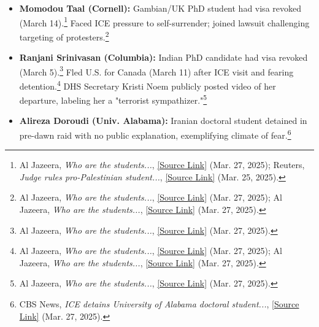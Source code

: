 \documentclass[11pt, letterpaper]{article}
\begin{document}
\begin{itemize}
        \item \textbf{Momodou Taal (Cornell):} Gambian/UK PhD student had visa revoked (March 14).\footnote{Al Jazeera, \emph{Who are the students...}, \href{https://www.aljazeera.com/news/2025/3/27/who-are-the-students-trump-wants-to-deport\#:~:text=Advertisement}{[Source Link]} (Mar. 27, 2025); Reuters, \emph{Judge rules pro-Palestinian student...}, \href{https://www.reuters.com/legal/judge-rules-pro-palestinian-student-permanent-us-resident-cannot-be-detained-2025-03-25/\#:~:text=Badar\%20Khan\%20Suri\%20\%2C\%20an,A\%20federal\%20judge\%20\%20102}{[Source Link]} (Mar. 25, 2025).} Faced ICE pressure to self-surrender; joined lawsuit challenging targeting of protesters.\footnote{Al Jazeera, \emph{Who are the students...}, \href{https://www.aljazeera.com/news/2025/3/27/who-are-the-students-trump-wants-to-deport\#:~:text=On\%20the\%20morning\%20of\%20March,his\%20residence\%2C\%20including\%20on\%20campus}{[Source Link]} (Mar. 27, 2025); Al Jazeera, \emph{Who are the students...}, \href{https://www.aljazeera.com/news/2025/3/27/who-are-the-students-trump-wants-to-deport\#:~:text=Taal\%20told\%20Al\%20Jazeera\%20that,one\%20focused\%20on\%20university\%20campuses}{[Source Link]} (Mar. 27, 2025).}
        \item \textbf{Ranjani Srinivasan (Columbia):} Indian PhD candidate had visa revoked (March 5).\footnote{Al Jazeera, \emph{Who are the students...}, \href{https://www.aljazeera.com/news/2025/3/27/who-are-the-students-trump-wants-to-deport\#:~:text=Ranjani\%20Srinivasan\%2C\%2037\%2C\%20had\%20her,a\%20valid\%20visa\%20until\%202029}{[Source Link]} (Mar. 27, 2025).} Fled U.S. for Canada (March 11) after ICE visit and fearing detention.\footnote{Al Jazeera, \emph{Who are the students...}, \href{https://www.aljazeera.com/news/2025/3/27/who-are-the-students-trump-wants-to-deport\#:~:text=On\%20March\%207\%2C\%20individuals\%20claiming,the\%20US\%2C\%20before\%20eventually\%20leaving}{[Source Link]} (Mar. 27, 2025); Al Jazeera, \emph{Who are the students...}, \href{https://www.aljazeera.com/news/2025/3/27/who-are-the-students-trump-wants-to-deport\#:~:text=After\%20this\%2C\%20Srinivasan\%20left\%20her,\%E2\%80\%9D}{[Source Link]} (Mar. 27, 2025).} DHS Secretary Kristi Noem publicly posted video of her departure, labeling her a "terrorist sympathizer."\footnote{Al Jazeera, \emph{Who are the students...}, \href{https://www.aljazeera.com/news/2025/3/27/who-are-the-students-trump-wants-to-deport\#:~:text=On\%20March\%2014\%2C\%20DHS\%20Secretary,sympathizers\%E2\%80\%9D\%20leaving\%20on\%20their\%20own}{[Source Link]} (Mar. 27, 2025).}
        \item \textbf{Alireza Doroudi (Univ. Alabama):} Iranian doctoral student detained in pre-dawn raid with no public explanation, exemplifying climate of fear.\footnote{CBS News, \emph{ICE detains University of Alabama doctoral student...}, \href{https://www.cbsnews.com/news/ice-detains-university-of-alabama-doctoral-student/?intcid=CNI-00-10aaa3a\#:~:text=Alireza\%20Doroudi\%2C\%20a\%20doctoral\%20student,his\%20home\%2C\%20the\%20paper\%20reported}{[Source Link]} (Mar. 27, 2025).}
    \end{itemize}
\end{document}

